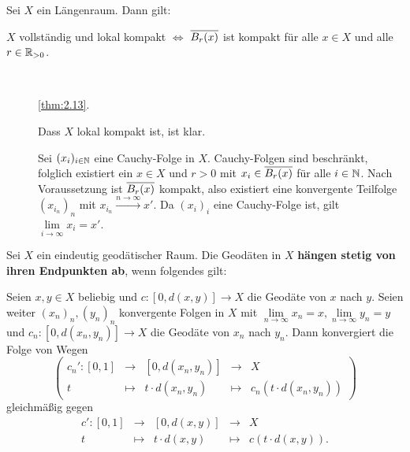 \begin{korollar}
\label{kor:2.16}
	Sei $X$ ein Längenraum.
	Dann gilt:
	\begin{center}
		$X$ vollständig und lokal kompakt \quad $\Leftrightarrow$ \quad $\overline{B_r(x)}$ ist kompakt für alle $x \in X$ und alle $r \in \mathbb{R}_{>0}$.
	\end{center}
\end{korollar}

\begin{beweis}
	\mbox{} \\[-.9cm]
	\begin{description}
		\item[\bewhin] \autoref{thm:2.13}.
		\item[\bewrueck] Dass $X$ lokal kompakt ist, ist klar.
		
		Sei $(x_i)_{i \in \mathbb{N}}$ eine Cauchy-Folge in $X$.
		Cauchy-Folgen sind beschränkt, folglich existiert ein $x \in X$ und $r > 0$ mit $x_i \in \overline{B_r(x)}$ für alle $i \in \mathbb{N}$.
		Nach Voraussetzung ist $\overline{B_r(x)}$ kompakt, also existiert eine konvergente Teilfolge $(x_{i_n})_n$ mit $x_{i_n} \xrightarrow{n \rightarrow \infty} x'$.
		Da $(x_i)_i$ eine Cauchy-Folge ist, gilt $\lim\limits_{i \rightarrow \infty} x_i = x'$. \qedhere
	\end{description}
\end{beweis}

\begin{definition}
\label{def:2.17}
	Sei $X$ ein eindeutig geodätischer Raum. 
	Die Geodäten in $X$ \textbf{hängen stetig von ihren Endpunkten ab}, wenn folgendes gilt:
	
	Seien $x,y \in X$ beliebig und $c\colon [0,d(x,y)] \rightarrow X$ die Geodäte von $x$ nach $y$.
	Seien weiter $(x_n)_n, (y_n)_n$ konvergente Folgen in $X$ mit $\lim\limits_{n \rightarrow \infty} x_n = x, \lim\limits_{n \rightarrow \infty} y_n = y$ und $c_n \colon [0,d(x_n,y_n)] \rightarrow X$ die Geodäte von $x_n$ nach $y_n$.
	Dann konvergiert die Folge von Wegen
	\[
		\left( \begin{array}{rcccl}
			c_n'\colon [0,1] & \longrightarrow & [0,d(x_n,y_n)] & \longrightarrow & X \\
			t & \longmapsto & t \cdot d(x_n,y_n) & \longmapsto & c_n(t \cdot d(x_n,y_n))
		\end{array} \right)
	\]
	gleichmäßig gegen
	\[
		\begin{array}{rcccl}
			c'\colon [0,1] & \longrightarrow & [0,d(x,y)] & \longrightarrow & X \\
			t & \longmapsto & t \cdot d(x,y) & \longmapsto & c(t \cdot d(x,y)).
		\end{array}
	\]	
\end{definition}

